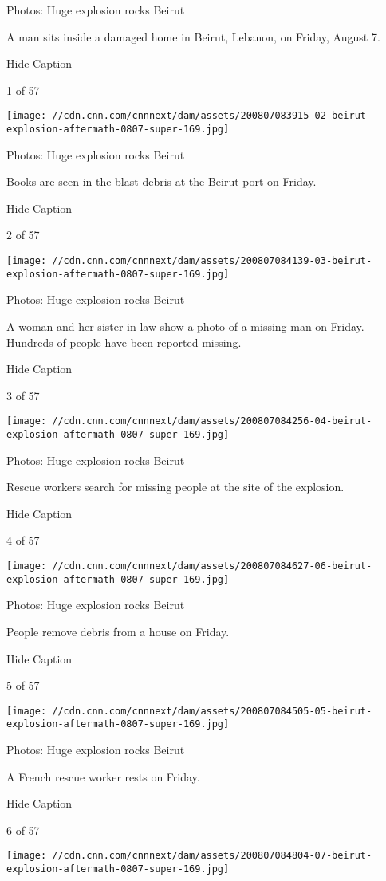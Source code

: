 Photos: Huge explosion rocks Beirut

A man sits inside a damaged home in Beirut, Lebanon, on Friday, August
7.

Hide Caption

1 of 57

\texttt{[image: //cdn.cnn.com/cnnnext/dam/assets/200807083915-02-beirut-explosion-aftermath-0807-super-169.jpg]}

Photos: Huge explosion rocks Beirut

Books are seen in the blast debris at the Beirut port on Friday.

Hide Caption

2 of 57

\texttt{[image: //cdn.cnn.com/cnnnext/dam/assets/200807084139-03-beirut-explosion-aftermath-0807-super-169.jpg]}

Photos: Huge explosion rocks Beirut

A woman and her sister-in-law show a photo of a missing man on Friday.
Hundreds of people have been reported missing.

Hide Caption

3 of 57

\texttt{[image: //cdn.cnn.com/cnnnext/dam/assets/200807084256-04-beirut-explosion-aftermath-0807-super-169.jpg]}

Photos: Huge explosion rocks Beirut

Rescue workers search for missing people at the site of the explosion.

Hide Caption

4 of 57

\texttt{[image: //cdn.cnn.com/cnnnext/dam/assets/200807084627-06-beirut-explosion-aftermath-0807-super-169.jpg]}

Photos: Huge explosion rocks Beirut

People remove debris from a house on Friday.

Hide Caption

5 of 57

\texttt{[image: //cdn.cnn.com/cnnnext/dam/assets/200807084505-05-beirut-explosion-aftermath-0807-super-169.jpg]}

Photos: Huge explosion rocks Beirut

A French rescue worker rests on Friday.

Hide Caption

6 of 57

\texttt{[image: //cdn.cnn.com/cnnnext/dam/assets/200807084804-07-beirut-explosion-aftermath-0807-super-169.jpg]}

